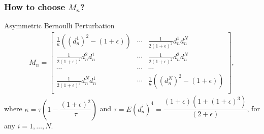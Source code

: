\begin{frame}
\begin{small}
\frametitle{\centering  How to choose $M_n$?}
\begin{block}{\alert{Asymmetric Bernoulli Perturbation}}
\begin{align}
\label{eq:2rdsa-estimate-ber}
 M_n =
\left[
\begin{array}{ccc}
\frac{1}{\kappa}\left((d_n^1)^2\!-(1+\epsilon)\right) & \cdots & \frac{1}{2(1+\epsilon)^2}d_n^1 d_n^N\\
\frac{1}{2(1+\epsilon)^2}d_n^2 d_n^1  &  \cdots & \frac{1}{2(1+\epsilon)^2}d_n^2 d_n^N\\
\cdots&\cdots&\cdots\\
\frac{1}{2(1+\epsilon)^2}d_n^N d_n^1 & \cdots &  \frac{1}{\kappa}\left((d_n^N)^2-(1+\epsilon)\right) \\
\end{array}
\right],
\end{align}
where $\kappa = \tau \left(1- \dfrac{(1+\epsilon)^2}{\tau}\right)$ and $\tau = E (d_n^i)^4= \dfrac{(1+\epsilon)(1+(1+\epsilon)^3)}{(2+\epsilon)}$, for any $i=1,\ldots,N$. 
\end{block}

\end{small}
\end{frame}





